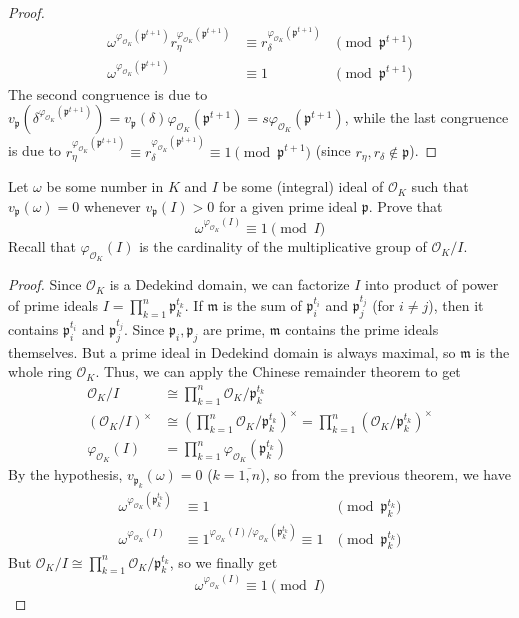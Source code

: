 \documentclass{treatise}
\begin{document}
\begin{proof}
\begin{align*}
\omega^{\varphi_{\mathcal{O}_K} (\mathfrak{p}^{t + 1})} r_\eta^{\varphi_{\mathcal{O}_K} (\mathfrak{p}^{t + 1})} & \equiv r_\delta^{\varphi_{\mathcal{O}_K} (\mathfrak{p}^{t + 1})} & \pmod{\mathfrak{p}^{t + 1}} \\
\omega^{\varphi_{\mathcal{O}_K} (\mathfrak{p}^{t + 1})} & \equiv 1 & \pmod{\mathfrak{p}^{t + 1}}
\end{align*}
The second congruence is due to $v_\mathfrak{p} (\delta^{\varphi_{\mathcal{O}_K} (\mathfrak{p}^{t + 1})}) = v_\mathfrak{p}(\delta) \varphi_{\mathcal{O}_K} (\mathfrak{p}^{t + 1}) = s \varphi_{\mathcal{O}_K} (\mathfrak{p}^{t + 1})$, while the last congruence is due to $r_\eta^{\varphi_{\mathcal{O}_K} (\mathfrak{p}^{t + 1})} \equiv r_\delta^{\varphi_{\mathcal{O}_K} (\mathfrak{p}^{t + 1})} \equiv 1 \pmod{\mathfrak{p}^{t + 1}}$ (since $r_\eta, r_\delta \notin \mathfrak{p}$).
\end{proof}
\begin{corollary}
Let $\omega$ be some number in $K$ and $I$ be some (integral) ideal of $\mathcal{O}_K$ such that $v_\mathfrak{p} (\omega) = 0$ whenever $v_\mathfrak{p} (I) > 0$ for a given prime ideal $\mathfrak{p}$. Prove that
$$\omega^{\varphi_{\mathcal{O}_K} (I)} \equiv 1 \pmod{I}$$
Recall that $\varphi_{\mathcal{O}_K} (I)$ is the cardinality of the multiplicative group of $\mathcal{O}_K / I$.
\end{corollary}
\begin{proof}
Since $\mathcal{O}_K$ is a Dedekind domain, we can factorize $I$ into product of power of prime ideals $I = \prod_{k = 1}^n \mathfrak{p}_k^{t_k}$. If $\mathfrak{m}$ is the sum of $\mathfrak{p}_i^{t_i}$ and $\mathfrak{p}_j^{t_j}$ (for $i \neq j$), then it contains $\mathfrak{p}_i^{t_i}$ and $\mathfrak{p}_j^{t_j}$. Since $\mathfrak{p}_i, \mathfrak{p}_j$ are prime, $\mathfrak{m}$ contains the prime ideals themselves. But a prime ideal in Dedekind domain is always maximal, so $\mathfrak{m}$ is the whole ring $\mathcal{O}_K$. Thus, we can apply the Chinese remainder theorem to get
\begin{align*}
\mathcal{O}_K / I & \cong \prod_{k = 1}^n \mathcal{O}_K / \mathfrak{p}_k^{t_k} \\
(\mathcal{O}_K / I)^\times & \cong \left( \prod_{k = 1}^n \mathcal{O}_K / \mathfrak{p}_k^{t_k} \right)^\times = \prod_{k = 1}^n (\mathcal{O}_K / \mathfrak{p}_k^{t_k})^\times \\
\varphi_{\mathcal{O}_K} (I) & = \prod_{k = 1}^n \varphi_{\mathcal{O}_K} (\mathfrak{p}_k^{t_k})
\end{align*}
By the hypothesis, $v_{\mathfrak{p}_k} (\omega) = 0$ ($k = \overline{1, n}$), so from the previous theorem, we have
\begin{align*}
\omega^{\varphi_{\mathcal{O}_K} (\mathfrak{p}_k^{t_k})} & \equiv 1 & \pmod{\mathfrak{p}_k^{t_k}} \\
\omega^{\varphi_{\mathcal{O}_K} (I)} & \equiv 1^{\varphi_{\mathcal{O}_K} (I) / \varphi_{\mathcal{O}_K} (\mathfrak{p}_k^{t_k})} \equiv 1 & \pmod{\mathfrak{p}_k^{t_k}}
\end{align*}
But $\mathcal{O}_K / I \cong \prod_{k = 1}^n \mathcal{O}_K / \mathfrak{p}_k^{t_k}$, so we finally get
$$\omega^{\varphi_{\mathcal{O}_K} (I)} \equiv 1 \pmod{I}$$
\end{proof}
\end{document}
